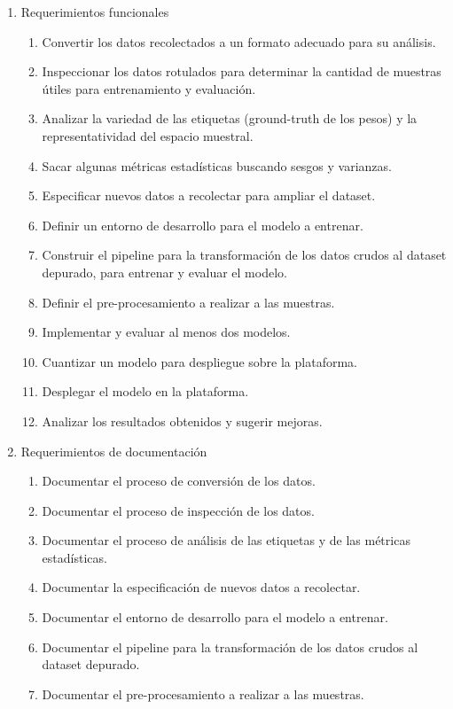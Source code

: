 \documentclass[
11pt, %
codirector, %
]{charter}
\begin{document}
\begin{enumerate}
	\item Requerimientos funcionales
		\begin{enumerate}
			\item Convertir los datos recolectados a un formato adecuado 					  para su análisis.
			\item Inspeccionar los datos rotulados para determinar la 						cantidad de muestras útiles para entrenamiento y 							evaluación.
			\item Analizar la variedad de las etiquetas (ground-truth de 					  los pesos) y la representatividad del espacio 								muestral.
			\item Sacar algunas métricas estadísticas buscando sesgos y 						varianzas.
			\item Especificar nuevos datos a recolectar para ampliar el 						dataset.
			\item Definir un entorno de desarrollo para el modelo a 							entrenar.
			\item Construir el pipeline para la transformación de los 							datos crudos al dataset depurado, para entrenar y 						evaluar el modelo.
			\item Definir el pre-procesamiento a realizar a las muestras.
			\item Implementar y evaluar al menos dos modelos.
			\item Cuantizar un modelo para despliegue sobre la plataforma.
			\item Desplegar el modelo en la plataforma.
			\item Analizar los resultados obtenidos y sugerir mejoras.
		\end{enumerate}
	\item Requerimientos de documentación
		\begin{enumerate}
			\item Documentar el proceso de conversión de los datos.
			\item Documentar el proceso de inspección de los datos.
			\item Documentar el proceso de análisis de las etiquetas y de 						las métricas estadísticas.
			\item Documentar la especificación de nuevos datos a recolectar.
			\item Documentar el entorno de desarrollo para el modelo a entrenar.
			\item Documentar el pipeline para la transformación de los datos crudos al dataset depurado.
			\item Documentar el pre-procesamiento a realizar a las muestras.

\end{enumerate}
\end{enumerate}
\end{document}
